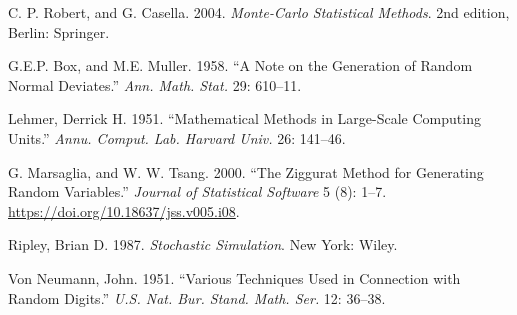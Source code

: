 \hypertarget{refs}{}
\begin{cslreferences}
\leavevmode\hypertarget{refV-roca}{}%
C. P. Robert, and G. Casella. 2004. \emph{Monte-Carlo Statistical
Methods}. 2nd edition, Berlin: Springer.

\leavevmode\hypertarget{refV-BoxMuller}{}%
G.E.P. Box, and M.E. Muller. 1958. ``A Note on the Generation of Random
Normal Deviates.'' \emph{Ann. Math. Stat.} 29: 610--11.

\leavevmode\hypertarget{refV-Lehmer}{}%
Lehmer, Derrick H. 1951. ``Mathematical Methods in Large-Scale Computing
Units.'' \emph{Annu. Comput. Lab. Harvard Univ.} 26: 141--46.

\leavevmode\hypertarget{refV-Ziggurat}{}%
G. Marsaglia, and W. W. Tsang. 2000. ``The Ziggurat Method for
Generating Random Variables.'' \emph{Journal of Statistical Software}
5 (8): 1--7. \url{https://doi.org/10.18637/jss.v005.i08}.

\leavevmode\hypertarget{refV-ripley}{}%
Ripley, Brian D. 1987. \emph{Stochastic Simulation}. New York: Wiley.

\leavevmode\hypertarget{refV-vonNeumann}{}%
Von Neumann, John. 1951. ``Various Techniques Used in Connection with
Random Digits.'' \emph{U.S. Nat. Bur. Stand. Math. Ser.} 12: 36--38.
\end{cslreferences}
